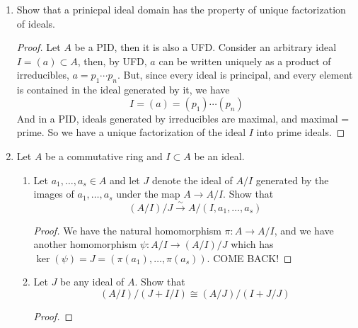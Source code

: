 \documentclass[hidelinks,12pt]{article}
\begin{document}
\begin{enumerate}
\begin{proof}
        \end{proof}
    \item Show that a prinicpal ideal domain has the property of unique factorization of ideals.
        \begin{proof}
        Let \(A\) be a PID, then it is also a UFD. Consider an arbitrary ideal \(I=(a)\subset A\), then, by UFD, \(a\) can be written uniquely as a product of irreducibles, \(a=p_{1}\cdots p_{n}\). But, since every ideal is principal, and every element is contained in the ideal generated by it, we have \[
            I=(a)=(p_{1})\cdots(p_{n})
        \]
        And in a PID, ideals generated by irreducibles are maximal, and maximal = prime. So we have a unique factorization of the ideal \(I\) into prime ideals. 
        \end{proof}
    \item Let \(A\) be a commutative ring and \(I\subset A\) be an ideal.
        \begin{enumerate}[label=(\alph*).]
            \item Let \(a_{1},\dots,a_{s}\in A\) and let \(J\) denote the ideal of \(A/I\) generated by the images of \(a_{1},\dots,a_{s}\) under the map \(A\to A/I\). Show that \[
                    (A/I)/J\overset{\sim}{\to} A/(I,a_{1},\dots,a_{s})
            \]
            \begin{proof}
           We have the natural homomorphism \(\pi:A\to A/I\), and we have another homomorphism \(\psi:A/I\to (A/I)/J\) which has \(\ker(\psi)=J=(\pi(a_{1}),\dots,\pi(a_{s}))\). COME BACK!
            \end{proof}
            \item Let \(J\) be any ideal of \(A\). Show that \[
                    (A/I)/(J+I/I)\cong(A/J)/(I+J/J)
            \]
           \begin{proof}
           

\end{proof}
\end{enumerate}
\end{enumerate}
\end{document}
